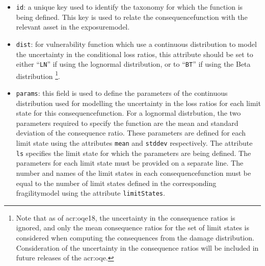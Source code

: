 \begin{itemize}

    \item \Verb+id+: a unique key used to identify the \gls{taxonomy} for 
    which the function is being defined. This key is used to relate the 
    \gls{consequencefunction} with the relevant \gls{asset} in the 
    \gls{exposuremodel}.

    \item \Verb+dist+: for vulnerability function which use a continuous 
    distribution to model the uncertainty in the conditional loss ratios, 
    this attribute should be set to either ``\Verb+LN+'' if using the lognormal
    distribution, or to ``\Verb+BT+'' if using the Beta distribution
    \footnote{Note that as of \glsdesc{acr:oqe18}, the uncertainty in the 
    consequence ratios is ignored, and only the mean consequence ratios for the
    set of limit states is considered when computing the consequences from the
    damage distribution. Consideration of the uncertainty in the consequence
    ratios will be included in future releases of the \glsdesc{acr:oqe}.}.

    \item \Verb+params+: this field is used to define the parameters of 
    the continuous distribution used for modelling the uncertainty in the
    loss ratios for each limit state for this 
    \gls{consequencefunction}. For a lognormal distrbution, 
    the two parameters required to specify the function are the mean and 
    standard deviation of the consequence ratio. These parameters are defined for 
    each limit state using the attributes \Verb+mean+ and \Verb+stddev+ 
    respectively. The attribute \Verb+ls+ specifies the limit state for which 
    the parameters are being defined. The parameters for each limit state
    must be provided on a separate line. The number and names of the limit 
    states in each \gls{consequencefunction} must be equal to the number of limit 
    states defined in the corresponding \gls{fragilitymodel}
    using the attribute \Verb+limitStates+.

\end{itemize}